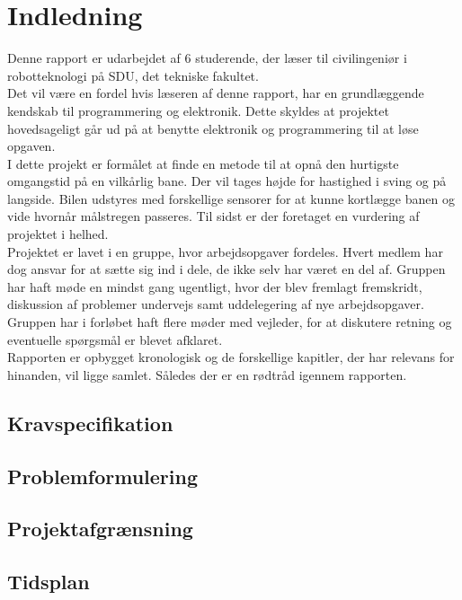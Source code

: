 \section{Indledning}

Denne rapport er udarbejdet af 6 studerende, der læser til civilingeniør i robotteknologi på SDU, det tekniske fakultet.\\

Det vil være en fordel hvis læseren af denne rapport, har en grundlæggende kendskab til programmering og elektronik. Dette skyldes at projektet hovedsageligt går ud på at benytte elektronik og programmering til at løse opgaven.\\

I dette projekt er formålet at finde en metode til at opnå den hurtigste omgangstid på en vilkårlig bane. Der vil tages højde for hastighed i sving og på langside. Bilen udstyres med forskellige sensorer for at kunne kortlægge banen og vide hvornår målstregen passeres. Til sidst er der foretaget en vurdering af projektet i helhed.\\

Projektet er lavet i en gruppe, hvor arbejdsopgaver fordeles. Hvert medlem har dog ansvar for at sætte sig ind i dele, de ikke selv har været en del af. Gruppen har haft møde en mindst gang ugentligt, hvor der blev fremlagt fremskridt, diskussion af problemer undervejs samt uddelegering af nye arbejdsopgaver. Gruppen har i forløbet haft flere møder med vejleder, for at diskutere retning og eventuelle spørgsmål er blevet afklaret.\\

Rapporten er opbygget kronologisk og de forskellige kapitler, der har relevans for hinanden, vil ligge samlet. Således der er en rødtråd igennem rapporten.\\

\subsection{Kravspecifikation}

\subsection{Problemformulering}

\subsection{Projektafgrænsning}

\subsection{Tidsplan}